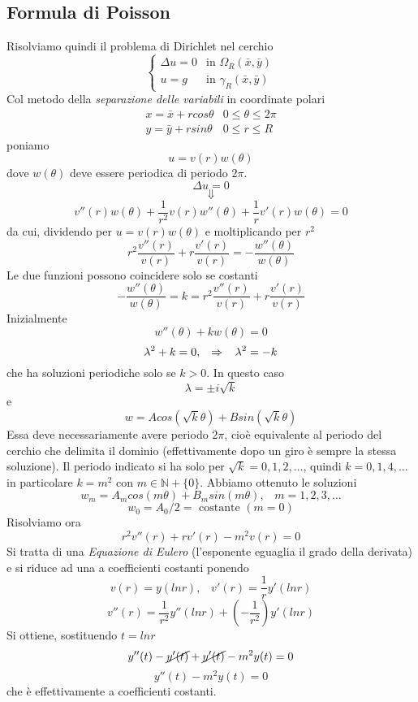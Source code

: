 \subsection{Formula di Poisson}
Risolviamo quindi il problema di Dirichlet nel cerchio
\[
	\left\{
	\begin{array}{ll}
		\Delta u=0 	& \text{in } \Omega_R(\bar{x}, \bar{y}) \\
		u=g 		& \text{in } \gamma_R(\bar{x}, \bar{y})
	\end{array}
	\right.
\]
Col metodo della \textit{separazione delle variabili} in coordinate polari
\[
	\begin{array}{ll}
		x= \bar{x} + rcos \theta & 0 \leq \theta \leq 2 \pi \\
		y= \bar{y} + rsin \theta & 0 \leq r \leq R
	\end{array}
\]
poniamo
\[
	u= v(r)w(\theta)
\]
dove $w(\theta)$ deve essere periodica di periodo $2 \pi$.
\[
	\Delta u = 0
\]
\[
	\Downarrow
\]
\[
	v''(r)w(\theta)+ \frac{1}{r^2}v(r)w''(\theta)+ \frac{1}{r}v'(r)w(\theta)=0
\]
da cui, dividendo per $u= v(r)w(\theta)$ e moltiplicando per $r^2$
\[
	r^2 \frac{ v''(r)}{v(r)} + r \frac{v'(r)}{v(r)}= 
	-\frac{w''(\theta)}{w(\theta)}
\]
Le due funzioni possono coincidere solo se costanti
\[
	- \frac{w''(\theta)}{w(\theta)}= k =
	r^2 \frac{ v''(r)}{v(r)} + r \frac{v'(r)}{v(r)}
\]
Inizialmente
\[
	w''(\theta)+ kw(\theta) =0
\]
\[
	\lambda^2 + k=0, \;\;\; \Rightarrow \;\;\; \lambda^2 = -k
\]
che ha soluzioni periodiche solo se $k > 0$.
In questo caso
\[
	\lambda= \pm i\sqrt{k}
\]
e
\[
	w= Acos(\sqrt{k} \theta)+ Bsin(\sqrt{k} \theta)
\]
Essa deve necessariamente avere periodo $2\pi$, cio\`e equivalente al periodo
del cerchio che delimita il dominio (effettivamente dopo un giro \`e sempre
la stessa soluzione).
Il periodo indicato si ha solo per $\sqrt{k}= 0,1,2,\ldots$, quindi 
$k= 0,1,4, \ldots$ in particolare $k=m^2$ con $m \in \mathbb{N}+\{0\}$.
Abbiamo ottenuto le soluzioni
\[
	w_m= A_m cos (m\theta)+ B_m sin (m \theta), \;\;\; m=1,2,3,\ldots
\]
\[
	w_0= A_0/2= \text{ costante } (m=0)
\]
Risolviamo ora
\[
	r^2 v''(r)+ rv'(r)- m^2 v(r)=0
\]
Si tratta di una \textit{Equazione di Eulero} (l'esponente eguaglia il grado
della derivata) e si riduce ad una a coefficienti costanti ponendo
\[
	v(r)= y(ln r), \;\;\; v'(r)= \frac{1}{r} y'(ln r)
\]
\[
	v''(r)= \frac{1}{r^2}y''(ln r) + \left( - \frac{1}{r^2} \right)y'(ln r)
\]
Si ottiene, sostituendo $t= ln r$
\[
	y''(t)- \cancel{y'(t)}+ \cancel{y'(t)} - m^2 y(t)=0
\]
\[
	y''(t) - m^2 y(t)=0
\]
che \`e effettivamente a coefficienti costanti.\\
